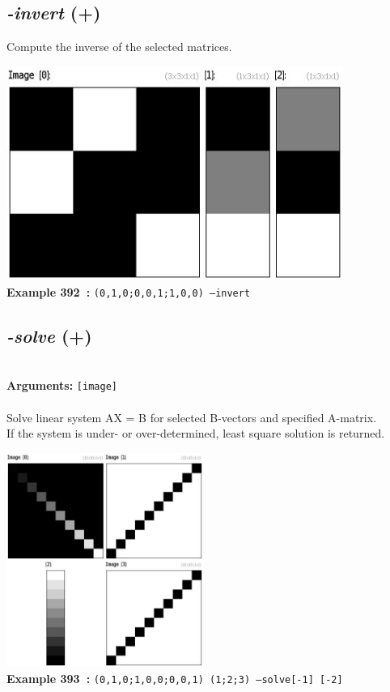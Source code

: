 \documentclass[a4paper,11pt,twoside]{book}
\begin{document}
\subsection{\emph{-invert} (+)}\vspace*{-0.5em}
Compute the inverse of the selected matrices.
\begin{center}\includegraphics[keepaspectratio=true,height=7cm,width=\textwidth]{img/gmic_def392.jpg}\\
{\footnotesize \textbf{Example 392~:} \texttt{(0,1,0;0,0,1;1,0,0) --invert}}
\end{center}

\subsection{\emph{-solve} (+)}\vspace*{-0.5em}
~\\\textbf{Arguments: } 
{\small \texttt{[image]}}\\~\\
Solve linear system AX = B for selected B-vectors and specified A-matrix.
~\\If the system is under- or over-determined, least square solution is returned.
\begin{center}\includegraphics[keepaspectratio=true,height=7cm,width=\textwidth]{img/gmic_def393.jpg}\\
{\footnotesize \textbf{Example 393~:} \texttt{(0,1,0;1,0,0;0,0,1) (1;2;3) --solve[-1] [-2]}}
\end{center}
\end{document}
